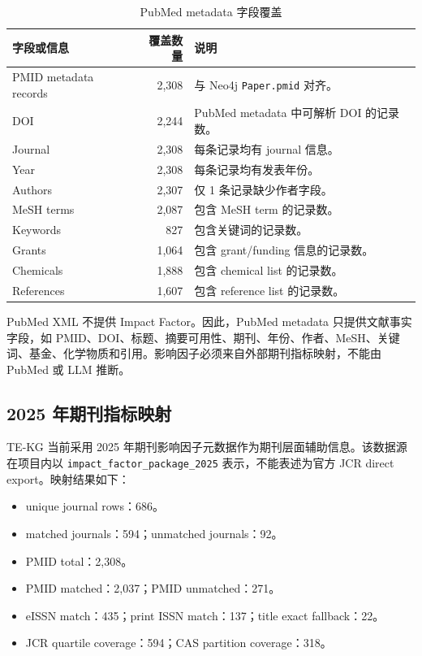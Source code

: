 \documentclass[12pt,a4paper,UTF8]{ctexart}
\newcommand{\code}[1]{\texttt{#1}}
\begin{document}
\begin{table}[H]
  \centering
  \caption{PubMed metadata 字段覆盖}
  \begin{tabularx}{0.86\textwidth}{l r Y}
    \toprule
    字段或信息 & 覆盖数量 & 说明 \\
    \midrule
    PMID metadata records & 2,308 & 与 Neo4j \code{Paper.pmid} 对齐。 \\
    DOI & 2,244 & PubMed metadata 中可解析 DOI 的记录数。 \\
    Journal & 2,308 & 每条记录均有 journal 信息。 \\
    Year & 2,308 & 每条记录均有发表年份。 \\
    Authors & 2,307 & 仅 1 条记录缺少作者字段。 \\
    MeSH terms & 2,087 & 包含 MeSH term 的记录数。 \\
    Keywords & 827 & 包含关键词的记录数。 \\
    Grants & 1,064 & 包含 grant/funding 信息的记录数。 \\
    Chemicals & 1,888 & 包含 chemical list 的记录数。 \\
    References & 1,607 & 包含 reference list 的记录数。 \\
    \bottomrule
  \end{tabularx}
\end{table}

PubMed XML 不提供 Impact Factor。因此，PubMed metadata 只提供文献事实字段，如 PMID、DOI、标题、摘要可用性、期刊、年份、作者、MeSH、关键词、基金、化学物质和引用。影响因子必须来自外部期刊指标映射，不能由 PubMed 或 LLM 推断。

\subsection{2025 年期刊指标映射}

TE-KG 当前采用 2025 年期刊影响因子元数据作为期刊层面辅助信息。该数据源在项目内以 \code{impact\_factor\_package\_2025} 表示，不能表述为官方 JCR direct export。映射结果如下：

\begin{itemize}
  \item unique journal rows：686。
  \item matched journals：594；unmatched journals：92。
  \item PMID total：2,308。
  \item PMID matched：2,037；PMID unmatched：271。
  \item eISSN match：435；print ISSN match：137；title exact fallback：22。
  \item JCR quartile coverage：594；CAS partition coverage：318。
\end{itemize}
\end{document}
